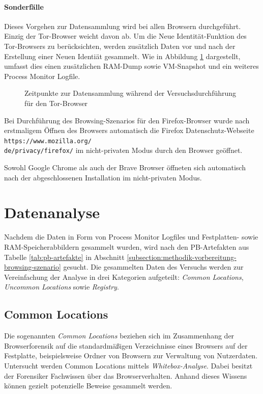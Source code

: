 \paragraph*{Sonderfälle}
Dieses Vorgehen zur Datensammlung wird bei allen Browsern durchgeführt. Einzig der Tor-Browser weicht davon ab. Um die \glqq{}Neue Identität\grqq{}-Funktion des Tor-Browsers zu berücksichten, werden zusätzlich Daten vor und nach der Erstellung einer \glqq{}Neuen Identiät\grqq{} gesammelt. Wie in Abbildung \ref{img:zeitpunkte-datensammlung-tor} dargestellt, umfasst dies einen zusätzlichen RAM-Dump sowie VM-Snapshot und ein weiteres Process Monitor Logfile.
\begin{figure}[h!]
	\centering
	\small
	\centerline{\resizebox{\linewidth}{!}{}}
	\caption{Zeitpunkte zur Datensammlung während der Versuchsdurchführung für den Tor-Browser}
	\label{img:zeitpunkte-datensammlung-tor}
\end{figure}

Bei Durchführung des Browsing-Szenarios für den Firefox-Browser wurde nach erstmaligem Öffnen des Browsers automatisch die Firefox Datenschutz-Webseite \texttt{https://www.mozilla.org/\\
de/privacy/firefox/} im nicht-privaten Modus durch den Browser geöffnet. 

Sowohl Google Chrome als auch der Brave Browser öffneten sich automatisch nach der abgeschlossenen Installation im nicht-privaten Modus.

\section{Datenanalyse}
\label{section:methodik-datenanalyse}
Nachdem die Daten in Form von Process Monitor Logfiles und Festplatten- sowie RAM-Speicherabbildern gesammelt wurden, wird nach den PB-Artefakten aus Tabelle \ref{tab:pb-artefakte} in Abschnitt \ref{subsection:methodik-vorbereitung-browsing-szenario} gesucht. 
Die gesammelten Daten des Versuchs werden zur Vereinfachung der Analyse in drei Kategorien aufgeteilt: \textit{Common Locations}, \textit{Uncommon Locations} sowie \textit{Registry}.

\subsection{Common Locations}
\label{subsection:methodik-datenanalyse-commonlocations}
Die sogenannten \textit{Common Locations} beziehen sich im Zusammenhang der Browserforensik auf die standardmäßigen Verzeichnisse eines Browsers auf der Festplatte, beispielsweise Ordner von Browsern zur Verwaltung von Nutzerdaten.
Untersucht werden Common Locations mittels \textit{Whitebox-Analyse}. Dabei besitzt der Forensiker Fachwissen über das Browserverhalten. Anhand dieses Wissens können gezielt potenzielle Beweise gesammelt werden. \cite{Bonetti.2014}

